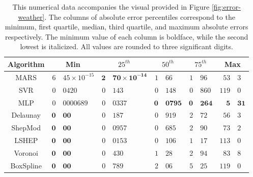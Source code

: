 \documentclass[smallextended,final]{svjour3}  %
\begin{document}
\begin{appendix}
\begin{table}
  \centering
  \begin{tabular}{c|r@{.}l|r@{.}l|r@{.}l|r@{.}l|r@{.}l}
    \hline
    Algorithm & \multicolumn{2}{c|}{Min} & \multicolumn{2}{c|}{$25^{th}$} & \multicolumn{2}{c|}{$50^{th}$} & \multicolumn{2}{c|}{$75^{th}$} & \multicolumn{2}{c}{Max}\\
    \hline
    MARS & $\mathit{6}$&$\mathit{45 \times 10^{-15}}$ & $\mathbf{2}$&$\mathbf{70 \times 10^{-14}}$ & $1$&$66$ & $1$&$96$ & $\mathit{53}$&$\mathit{3}$\\
    SVR & $0$&$0420$ & $0$&$143$ & $0$&$148$ & $\mathit{0}$&$\mathit{860}$ & $119$&$0$\\
    MLP & $0$&$0000689$ & $0$&$0337$ & $\mathbf{0}$&$\mathbf{0795}$ & $\mathbf{0}$&$\mathbf{264}$ & $\mathbf{5}$&$\mathbf{31}$\\
    Delaunay & $\mathbf{0}$&$\mathbf{00}$ & $0$&$187$ & $0$&$919$ & $2$&$72$ & $56$&$3$\\
    ShepMod & $\mathbf{0}$&$\mathbf{00}$ & $0$&$0957$ & $0$&$685$ & $2$&$90$ & $73$&$2$\\
    LSHEP & $\mathbf{0}$&$\mathbf{00}$ & $\mathit{0}$&$\mathit{0153}$ & $\mathit{0}$&$\mathit{106}$ & $1$&$17$ & $113$&$0$\\
    Voronoi & $\mathbf{0}$&$\mathbf{00}$ & $0$&$430$ & $1$&$28$ & $2$&$94$ & $83$&$8$\\
    BoxSpline & $\mathbf{0}$&$\mathbf{00}$ & $0$&$789$ & $2$&$06$ & $5$&$25$ & $119$&$0$\\
    \hline
  \end{tabular}
  \caption{This numerical data accompanies the visual provided in
    Figure \ref{fig:error-weather}. The columns of absolute error
    percentiles correspond to the minimum, first quartile, median,
    third quartile, and maximum absolute errors respectively. The
    minimum value of each column is boldface, while the second lowest
    is italicized. All values are rounded to three significant
    digits.}
  \label{table:error-weather}
\end{table}


\end{appendix}
\end{document}
